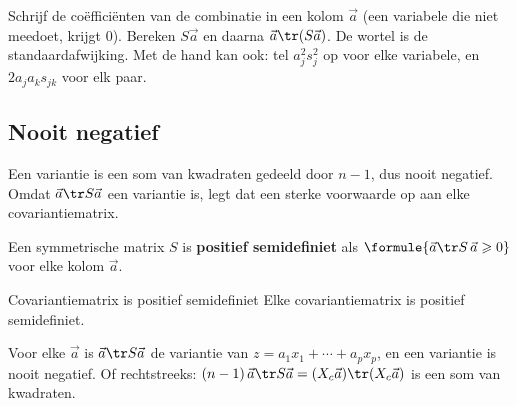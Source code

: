 
\begin{werkwijze}
Schrijf de coëfficiënten van de combinatie in een kolom $\vec a$ (een variabele die niet meedoet, krijgt 0). Bereken $S\vec a$ en daarna $\vec a\tr(S\vec a)$. De wortel is de standaardafwijking. Met de hand kan ook: tel $a_j^2 s_j^2$ op voor elke variabele, en $2a_ja_ks_{jk}$ voor elk paar.
\end{werkwijze}

\begin{oefeningen}
\end{oefeningen}

\subsection{Nooit negatief}

Een variantie is een som van kwadraten gedeeld door $n - 1$, dus nooit negatief. Omdat $\vec a\tr S\vec a$ een variantie is, legt dat een sterke voorwaarde op aan elke covariantiematrix.

\begin{theorie}
Een symmetrische matrix $S$ is \textbf{\textcolor{accent}{positief semidefiniet}} als $\formule{\vec a\tr S\,\vec a \geqslant 0}$ voor elke kolom $\vec a$.

\begin{stelling}{Covariantiematrix is positief semidefiniet}
Elke covariantiematrix is positief semidefiniet.
\end{stelling}

\begin{bewijs}
Voor elke $\vec a$ is $\vec a\tr S\vec a$ de variantie van $z = a_1x_1 + \cdots + a_px_p$, en een variantie is nooit negatief. Of rechtstreeks: $(n - 1)\,\vec a\tr S\vec a = (X_c\vec a)\tr(X_c\vec a)$ is een som van kwadraten.
\end{bewijs}
\end{theorie}

